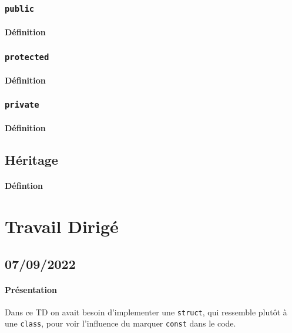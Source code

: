 \documentclass{article}
\begin{document}
\subsubsection{\texttt{public}}
\paragraph{Définition}

\subsubsection{\texttt{protected}}
\paragraph{Définition}

\subsubsection{\texttt{private}}
\paragraph{Définition}

\subsection{Héritage}
\paragraph{Défintion}


\section{Travail Dirigé}
\subsection{07/09/2022}
\paragraph{Présentation}Dans ce TD on avait besoin d'implementer une \texttt{struct}, qui ressemble plutôt à une \texttt{class}, pour voir l'influence du marquer \texttt{const} dans le code.
\begin{scriptsize}
    \mycode
    
\end{scriptsize}
\begin{scriptsize}
    \mycode
    
\end{scriptsize}
\end{document}
